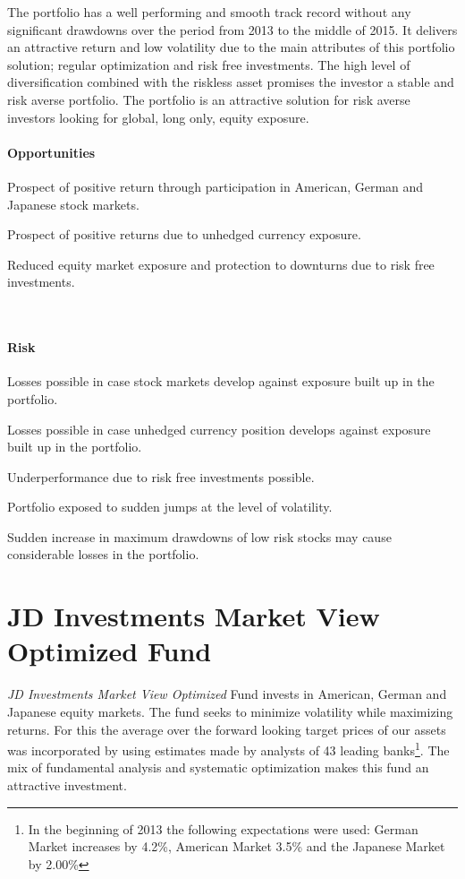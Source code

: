 \documentclass[11pt, DIV=15]{scrreprt}
\begin{document}
The portfolio has a well performing and smooth track record without any significant drawdowns over the period from 2013 to the middle of 2015.
It delivers an attractive return and low volatility due to the main attributes of this portfolio solution; regular optimization and risk free investments.
The high level of diversification combined with the riskless asset promises the investor a stable and risk averse portfolio.
The portfolio is an attractive solution for risk averse investors looking for global, long only, equity exposure.
 

\begin{minipage}[t]{0.49\textwidth}
  \paragraph{Opportunities}
  \begin{sit}
    \item Prospect of positive return through participation in American, German and Japanese stock markets.
    \item Prospect of positive returns due to unhedged currency exposure.
    \item Reduced equity market exposure and protection to downturns due to risk free investments.
  \end{sit}
\end{minipage}
~~
\begin{minipage}[t]{0.49\textwidth}
  \paragraph{Risk}
  \begin{sit}
    \item Losses possible in case stock markets develop against exposure built up in the portfolio.
    \item Losses possible in case unhedged currency position develops against exposure built up in the portfolio.
    \item Underperformance due to risk free investments possible.
    \item Portfolio exposed to sudden jumps at the level of volatility.
    \item Sudden increase in maximum drawdowns of low risk stocks may cause considerable losses in the portfolio.
  \end{sit}
\end{minipage}

\newpage\section*{JD Investments Market View Optimized Fund}
\textit{JD Investments Market View Optimized} Fund invests in American, German and Japanese equity markets.
The fund seeks to minimize volatility while maximizing returns.
For this the average over the forward looking target prices of our assets was incorporated by using estimates made by analysts of 43 leading banks\footnote{In the beginning of 2013 the following expectations were used: German Market increases by 4.2\%, American Market 3.5\% and the Japanese Market by 2.00\%}.
The mix of fundamental analysis and systematic optimization makes this fund an attractive investment.
\end{document}

